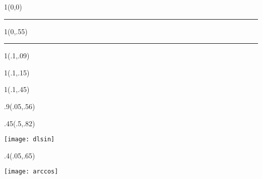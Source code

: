\pagestyle{empty}

\begin{textblock}{1}(0,0)
    \noindent\textcolor{plop}{\rule{\paperwidth}{.55\paperheight}}
\end{textblock}


\begin{textblock}{1}(0,.55)
    \noindent\textcolor{black}{\rule{\paperwidth}{.45\paperheight}}
\end{textblock}


\begin{textblock}{1}(.1,.09)
    \noindent{\fontsize{24.88}{2}\selectfont
        \bfseries\textcolor{white}{Note}}
\end{textblock}

\begin{textblock}{1}(.1,.15)
    \noindent {\fontsize{24.88}{2}\selectfont
    \bfseries\textcolor{white}{电磁场与微波技术}}
\end{textblock}


\begin{textblock}{1}(.1,.45)
    \noindent {\fontsize{20.74}{2}\selectfont
        \bfseries\textcolor{white}{hyq}}
\end{textblock}



\begin{textblock}{.9}(.05,.56)
    \begin{flushright}
        \noindent {\fontsize{20.74}{2}\selectfont
            \bfseries\textcolor{orange}{version 1.1}}
    \end{flushright}
\end{textblock}


\begin{textblock}{.45}(.5,.82)
    \begin{center}
        \texttt{[image: dlsin]}
    \end{center}
\end{textblock}

\begin{textblock}{.4}(.05,.65)
    \begin{center}
        \texttt{[image: arccos]}
    \end{center}
\end{textblock}



